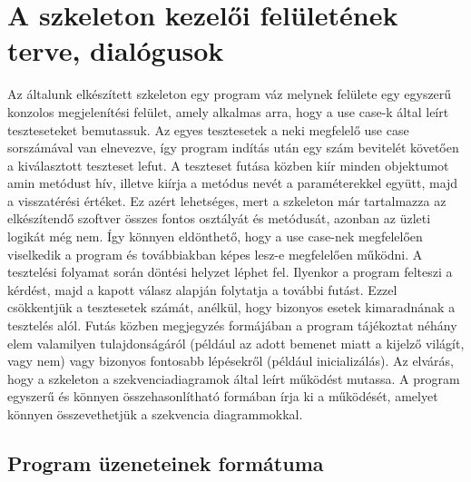 \section{A szkeleton kezelői felületének terve, dialógusok}
Az általunk elkészített szkeleton egy program váz melynek felülete egy egyszerű konzolos megjelenítési felület, amely alkalmas arra, hogy a use case-k által leírt teszteseteket bemutassuk. Az egyes tesztesetek a neki megfelelő use case sorszámával van elnevezve, így program indítás után egy szám bevitelét követően a kiválasztott teszteset lefut. 
A teszteset futása közben kiír minden objektumot amin metódust hív, illetve kiírja a metódus nevét a paraméterekkel együtt, majd a visszatérési értéket. Ez azért lehetséges, mert a szkeleton már tartalmazza az elkészítendő szoftver összes fontos osztályát és metódusát, azonban az üzleti logikát még nem. Így könnyen eldönthető, hogy a use case-nek megfelelően viselkedik a program és továbbiakban képes lesz-e megfelelően működni.
A tesztelési folyamat során döntési helyzet léphet fel. Ilyenkor a program felteszi a kérdést, majd a kapott válasz alapján folytatja a további futást. Ezzel csökkentjük a tesztesetek számát, anélkül, hogy bizonyos esetek kimaradnának a tesztelés alól. 
Futás közben megjegyzés formájában a program tájékoztat néhány elem valamilyen tulajdonságáról (például az adott bemenet miatt a kijelző világít, vagy nem) vagy bizonyos fontosabb lépésekről (például inicializálás).
Az elvárás, hogy a szkeleton a szekvenciadiagramok által leírt működést mutassa. A program egyszerű és könnyen összehasonlítható formában írja ki a működését, amelyet könnyen összevethetjük a szekvencia diagrammokkal.

\subsection{Program üzeneteinek formátuma}

